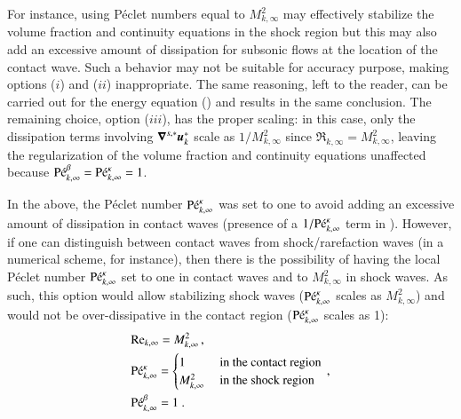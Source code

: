 \documentclass[preprint,10pt]{elsarticle}
\begin{document}
For instance, using P\'eclet numbers equal to $M_{k,\infty}^2$ may effectively stabilize the volume fraction and continuity 
equations in the shock region but this may also add an excessive amount of dissipation for subsonic 
flows at the location of the contact wave. Such a behavior may not be suitable for accuracy purpose, 
making options ($i$) and ($ii$) inappropriate. The same reasoning, left to the reader, can be carried out 
for the energy equation () and results in the same conclusion. The remaining 
choice, option ($iii$), has the proper scaling: in this case, only the dissipation terms involving 
$\boldsymbol\nabla^{s,*} \boldsymbol u_k^*$ scale as $1/M_{k,\infty}^2$ since $\Re_{k,\infty} = M_{k,\infty}^2$, leaving the 
regularization of the volume fraction and continuity equations unaffected because $\textrm{P\'e}_{k,\infty}^\beta = \textrm{P\'e}_{k,\infty}^\kappa =1$.
%
\begin{remark}
In the above, the P\'eclet number $\textrm{P\'e}_{k,\infty}^\kappa$ was set to one to avoid adding an excessive amount of dissipation in contact waves
(presence of a $1/\textrm{P\'e}_{k,\infty}^\kappa$ term in ). 
However, if one can distinguish between contact waves from shock/rarefaction waves (in a numerical scheme, for instance), then there is the possibility of 
having the local P\'eclet number $\textrm{P\'e}_{k,\infty}^\kappa$ set to one in contact waves and to $M^2_{k,\infty}$ in shock waves. 
As such, this option would allow stabilizing shock waves ($\textrm{P\'e}_{k,\infty}^\kappa$ scales as $M^2_{k,\infty}$) and would not be over-dissipative in the 
contact region ($\textrm{P\'e}_{k,\infty}^\kappa$ scales as 1):
%
\begin{align}
&\textrm{Re}_{k,\infty} = M_{k,\infty}^2 \,, \nonumber \\ 
& \textrm{P\'e}_{k,\infty}^\kappa = 
\begin{cases} 
1              & \text{ in the contact region} \\
M^2_{k,\infty} & \text{ in the shock region } 
\end{cases} \,,\nonumber \\ 
&\textrm{P\'e}_{k,\infty}^\beta = 1 \ . \nonumber
\end{align}
%
\end{remark}
%
\end{document}
